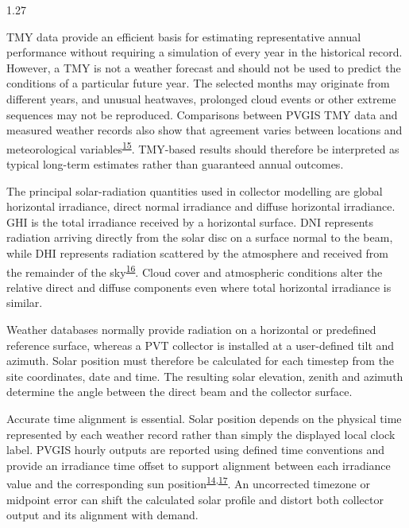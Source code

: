 \documentclass[12pt,letterpaper]{article}
\DeclareRobustCommand{\citenum}[1]{\hyperlink{ref:#1}{#1}} %
\begin{document}
\begin{spacing}{1.27}
\vspace{0.15in}

TMY data provide an efficient basis for estimating representative annual performance without requiring a simulation of every year in the historical record. However, a TMY is not a weather forecast and should not be used to predict the conditions of a particular future year. The selected months may originate from different years, and unusual heatwaves, prolonged cloud events or other extreme sequences may not be reproduced. Comparisons between PVGIS TMY data and measured weather records also show that agreement varies between locations and meteorological variables\textsuperscript{\citenum{15}}. TMY-based results should therefore be interpreted as typical long-term estimates rather than guaranteed annual outcomes.\par

\vspace{0.15in}

The principal solar-radiation quantities used in collector modelling are global horizontal irradiance, direct normal irradiance and diffuse horizontal irradiance. GHI is the total irradiance received by a horizontal surface. DNI represents radiation arriving directly from the solar disc on a surface normal to the beam, while DHI represents radiation scattered by the atmosphere and received from the remainder of the sky\textsuperscript{\citenum{16}}. Cloud cover and atmospheric conditions alter the relative direct and diffuse components even where total horizontal irradiance is similar.\par

\vspace{0.15in}

Weather databases normally provide radiation on a horizontal or predefined reference surface, whereas a PVT collector is installed at a user-defined tilt and azimuth. Solar position must therefore be calculated for each timestep from the site coordinates, date and time. The resulting solar elevation, zenith and azimuth determine the angle between the direct beam and the collector surface.\par

\vspace{0.15in}

Accurate time alignment is essential. Solar position depends on the physical time represented by each weather record rather than simply the displayed local clock label. PVGIS hourly outputs are reported using defined time conventions and provide an irradiance time offset to support alignment between each irradiance value and the corresponding sun position\textsuperscript{\citenum{14},\citenum{17}}. An uncorrected timezone or midpoint error can shift the calculated solar profile and distort both collector output and its alignment with demand.\par


\end{spacing}
\end{document}
